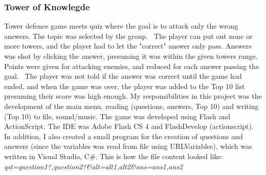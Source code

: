 \subsubsection{Tower of Knowlegde}
\label{sec:tower_of_knowledge}
Tower defence game meets quiz where the goal is to attack only the wrong answers. 
The topic was selected by the group. 
The player can put out none or more towers, and the player had to let the "correct" answer only pass.
\vspace{0.5em}\newline
Answers was shot by clicking the answer, presuming it was within the given towers range. 
Points were given for attacking enemies, and reduced for each answer passing the goal. 
The player was not told if the answer was correct until the game had ended, and when the game was over, the player was added to the Top 10 list presuming their score was high enough. 
My responsibilities in this project was the development of the main menu, reading (questions, answers, Top 10) and writing (Top 10) to file, sound/music.
\vspace{0.5em}\newline
The game was developed using Flash and ActionScript. The IDE was Adobe Flash CS 4 and FlashDevelop (actionscript). 
In addition, I also created a small program for the creation of questions and answers (since the variables was read from file using URLVariables), which was written in Visual Studio, C\#.
\vspace{0.5em}\newline
This is how the file content looked like:
\textit{qst=question1?,question2?\&alt=alt1,alt2\&ans=ans1,ans2}


